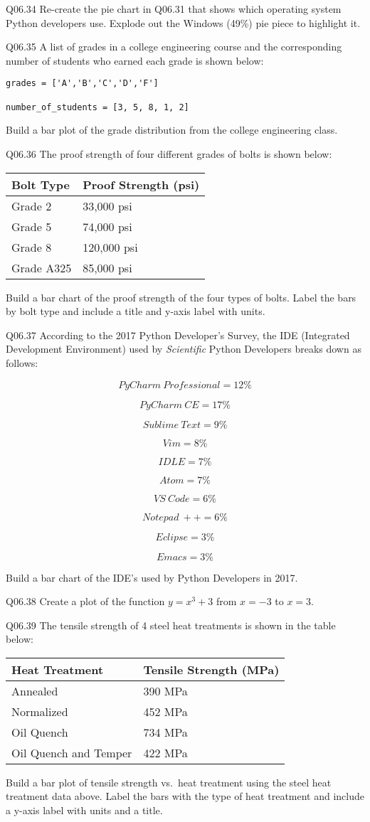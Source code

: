\documentclass{book}
\newenvironment{problems}{}{}  %
\begin{document}
\begin{problems}
Q06.34 Re-create the pie chart in Q06.31 that shows which operating
system Python developers use. Explode out the Windows (49\%) pie piece
to highlight it.

Q06.35 A list of grades in a college engineering course and the
corresponding number of students who earned each grade is shown below:

\begin{lstlisting}
grades = ['A','B','C','D','F']

number_of_students = [3, 5, 8, 1, 2]
\end{lstlisting}

Build a bar plot of the grade distribution from the college engineering
class.

Q06.36 The proof strength of four different grades of bolts is shown
below:

\begin{longtable}[]{@{}ll@{}}
\toprule
Bolt Type & Proof Strength (psi)\tabularnewline
\midrule
\endhead
Grade 2 & 33,000 psi\tabularnewline
Grade 5 & 74,000 psi\tabularnewline
Grade 8 & 120,000 psi\tabularnewline
Grade A325 & 85,000 psi\tabularnewline
\bottomrule
\end{longtable}

Build a bar chart of the proof strength of the four types of bolts.
Label the bars by bolt type and include a title and y-axis label with
units.

Q06.37 According to the 2017 Python Developer's Survey, the IDE
(Integrated Development Environment) used by \emph{Scientific} Python
Developers breaks down as follows:

\[ PyCharm \ Professional = 12\% \]

\[ PyCharm \ CE = 17\% \]

\[ Sublime \ Text = 9\% \]

\[ Vim = 8\% \]

\[ IDLE = 7\% \]

\[ Atom = 7\% \]

\[ VS \ Code = 6\% \]

\[ Notepad \ ++ = 6\% \]

\[ Eclipse = 3\% \]

\[ Emacs = 3\% \]

Build a bar chart of the IDE's used by Python Developers in 2017.

Q06.38 Create a plot of the function \(y=x^3+3\) from \(x=-3\) to
\(x=3\).

Q06.39 The tensile strength of 4 steel heat treatments is shown in the
table below:

\begin{longtable}[]{@{}ll@{}}
\toprule
Heat Treatment & Tensile Strength (MPa)\tabularnewline
\midrule
\endhead
Annealed & 390 MPa\tabularnewline
Normalized & 452 MPa\tabularnewline
Oil Quench & 734 MPa\tabularnewline
Oil Quench and Temper & 422 MPa\tabularnewline
\bottomrule
\end{longtable}

Build a bar plot of tensile strength vs.~heat treatment using the steel
heat treatment data above. Label the bars with the type of heat
treatment and include a y-axis label with units and a title.
        \end{problems}
\end{document}
